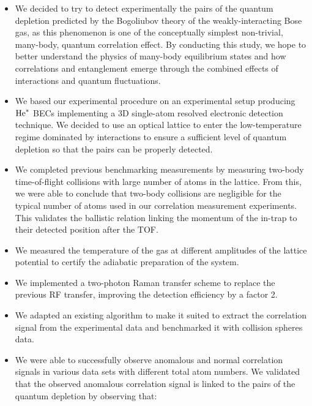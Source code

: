 \begin{itemize}
    \item We decided to try to detect experimentally the \kmk pairs of the quantum depletion predicted by the Bogoliubov theory of the weakly-interacting Bose gas, as this phenomenon is one of the conceptually simplest non-trivial, many-body, quantum correlation effect. By conducting this study, we hope to better understand the physics of many-body equilibrium states and how correlations and entanglement emerge through the combined effects of interactions and quantum fluctuations.
    \item We based our experimental procedure on an experimental setup producing $\mathrm{He}^*$ BECs  implementing a 3D single-atom resolved electronic detection technique. We decided to use an optical lattice to enter the low-temperature regime dominated by interactions to ensure a sufficient level of quantum depletion so that the \kmk pairs can be properly detected.
    \item We completed previous benchmarking measurements \cite{cayla2018single} by measuring two-body time-of-flight collisions with large number of atoms in the lattice. From this, we were able to conclude that two-body collisions are negligible for the typical number of atoms used in our correlation measurement experiments. This validates the ballistic relation linking the momentum of the in-trap to their detected position after the TOF.
    \item We measured the temperature of the gas at different amplitudes of the lattice potential to certify the adiabatic preparation of the system.
    \item We implemented a two-photon Raman transfer scheme to replace the previous RF transfer, improving the detection efficiency by a factor 2.
    \item We adapted an existing algorithm to make it suited to extract the \kmk correlation signal from the experimental data and benchmarked it with collision spheres data.
    \item We were able to successfully observe anomalous and normal correlation signals in various data sets with different total atom numbers. We validated that the observed anomalous correlation signal is linked to the \kmk pairs of the quantum depletion by observing that:
    \begin{itemize}
        

\end{itemize}
\end{itemize}
